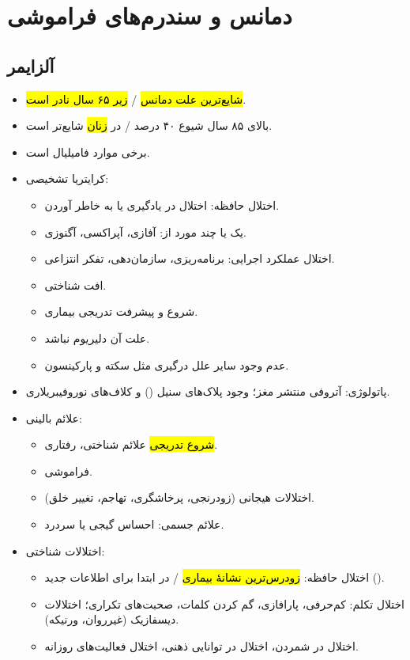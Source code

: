 \chapter{دمانس و سندرم‌های فراموشی}
\section{آلزایمر}
\begin{itemize}
\item \hl{شایع‌ترین علت دمانس} / \hl{زیر ۶۵ سال نادر است}.
\item بالای ۸۵ سال شیوع ۴۰ درصد / در \hl{زنان} شایع‌تر است.
\item برخی موارد فامیلیال است.
\item کرایتریا تشخیصی:
\begin{itemize}
\item اختلال حافظه: اختلال در یادگیری یا به خاطر آوردن.
\item یک یا چند مورد از: آفازی، آپراکسی، آگنوزی.
\item اختلال عملکرد اجرایی: برنامه‌ریزی، سازمان‌دهی، تفکر انتزاعی.
\item افت شناختی.
\item شروع و پیشرفت تدریجی بیماری.
\item علت آن دلیریوم نباشد.
\item عدم وجود سایر علل درگیری  مثل سکته و پارکینسون.
\end{itemize}
\item پاتولوژی: آتروفی منتشر مغز؛ وجود پلاک‌های سنیل () و کلاف‌های نوروفیبریلاری.
\item علائم بالینی:
\begin{itemize}
\item \hl{شروع تدریجی} علائم شناختی، رفتاری.
\item فراموشی.
\item اختلالات هیجانی (زودرنجی، پرخاشگری، تهاجم، تغییر خلق).
\item علائم جسمی: احساس گیجی یا سردرد.
\end{itemize}
\item اختلالات شناختی:
\begin{itemize}
\item اختلال حافظه: \hl{زودرس‌ترین نشانهٔ بیماری} / در ابتدا برای اطلاعات جدید ().
\item اختلال تکلم: کم‌حرفی، پارافازی، گم کردن کلمات، صحبت‌های تکراری؛ اختلالات دیسفازیک (غیرروان، ورنیکه).
\item اختلال در شمردن، اختلال در توانایی ذهنی، اختلال فعالیت‌های روزانه.
\end{itemize}
\end{itemize}

